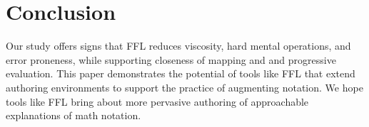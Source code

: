 \section{Conclusion}
Our study offers signs that FFL reduces viscosity, hard mental operations, and error proneness, while supporting closeness of mapping and and progressive evaluation. This paper demonstrates the potential of tools like FFL that extend authoring environments to support the practice of augmenting notation. We hope tools like FFL bring about more pervasive authoring of approachable explanations of math notation.

